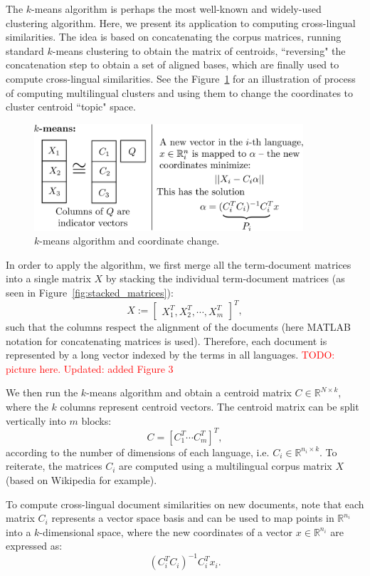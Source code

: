 \documentclass[twoside,11pt]{article}
\newcommand{\todo}[1]{\textcolor{red}{TODO: #1}}
\newcommand{\RR}{\mathbb{R}}
\begin{document}
The $k$-means algorithm is perhaps the most well-known and widely-used clustering algorithm. Here, we present its application
to computing cross-lingual similarities. The idea is based on concatenating the corpus matrices, running standard $k$-means clustering to obtain the matrix of centroids, ``reversing" the concatenation step to obtain a set of aligned bases, which are finally used to compute cross-lingual similarities. See the Figure~\ref{fig:kmeans} for an illustration of process of computing multilingual clusters and using them to change the coordinates to cluster centroid ``topic" space.

\begin{figure}[tbp]
\centering
\includegraphics[width=10cm]{kmeans.pdf}
\caption{\label{fig:kmeans} $k$-means algorithm and coordinate change.}
\end{figure}

 In order to apply the algorithm, we first merge all the term-document matrices into a single matrix $X$ by stacking the individual term-document matrices (as seen in Figure~\ref{fig:stacked_matrices}):
$$X := \begin{bmatrix}X_1^T ,X_2^T, \cdots, X_m^T \end{bmatrix}^T,$$
such that the columns respect the alignment of the documents (here MATLAB notation for concatenating matrices is used). Therefore, each document  is represented by a long vector indexed by the terms in all languages. \todo{picture here. Updated: added Figure 3}

We then run the $k$-means algorithm \cite{kmeans} and obtain a centroid matrix $C \in \RR^{N \times k}$, where the $k$ columns represent centroid vectors. The centroid matrix can be split vertically into $m$ blocks: $$C = [C_1^T \cdots C_m^T]^T,$$ according to the number of dimensions of each language, i.e. $C_i \in \RR^{n_i \times k}$.
%
To reiterate, the matrices $C_i$ are computed using a multilingual corpus matrix $X$ (based on Wikipedia for example).

To compute  cross-lingual document similarities on new documents, note that each matrix $C_i$ represents a vector space basis and can be used to map points in $\RR^{n_i}$ into a $k$-dimensional space, where the new coordinates of a vector $x \in \RR^{n_i}$ are expressed as: $$(C_i^T C_i)^{-1} C_i^T x_i.$$
\end{document}
